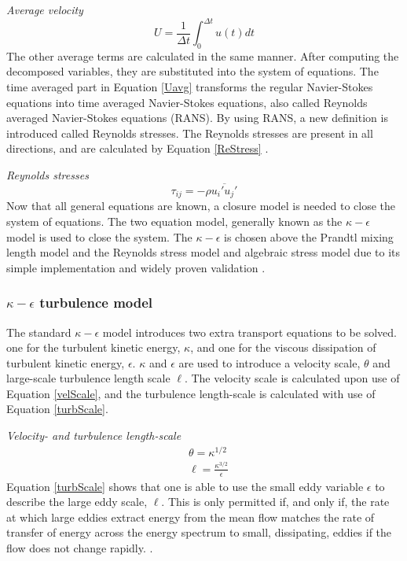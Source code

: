 \documentclass{CFD2017}
\begin{document}
\emph{Average velocity}
\begin{equation}
\label{Uavg}
U = \frac{1}{\Delta t}\int_{0}^{\Delta t}u(t)dt
\end{equation}
The other average terms are calculated in the same manner. After computing the decomposed variables, they are substituted into the system of equations. The time averaged part in Equation \ref{Uavg} transforms the regular Navier-Stokes equations into time averaged Navier-Stokes equations, also called Reynolds averaged Navier-Stokes equations (RANS). By using RANS, a new definition is introduced called Reynolds stresses. The Reynolds stresses are present in all directions, and are calculated by Equation \ref{ReStress} \cite{slides}. \vspace{2mm}

\emph{Reynolds stresses}
\begin{equation}
\label{ReStress}
\tau_{ij}=-\rho\overline{u_i'u_j'}
\end{equation}
Now that all general equations are known, a closure model is needed to close the system of equations. The two equation model, generally known as the $\kappa-\epsilon$ model is used to close the system. The $\kappa-\epsilon$ is chosen above the Prandtl mixing length model and the Reynolds stress model and algebraic stress model due to its simple implementation and widely proven validation \cite{Versteeg2007}.


\subsubsection{$\kappa-\epsilon$ turbulence model}
The standard  $\kappa-\epsilon$ model introduces two extra transport equations to be solved. one for the turbulent kinetic energy, $\kappa$, and one for the viscous dissipation of turbulent kinetic energy, $\epsilon$.  $\kappa$ and $\epsilon$ are used to introduce a velocity scale, $\theta$ and large-scale turbulence length scale $\ell$. The velocity scale is calculated upon use of Equation \ref{velScale}, and the turbulence length-scale is calculated with use of Equation \ref{turbScale}.\vspace{2mm}

\emph{Velocity- and turbulence length-scale}
\begin{align}
&\theta = \kappa^{1/2} \label{velScale}\\
&\ell=\frac{\kappa^{3/2}}{\epsilon} \label{turbScale}
\end{align}
Equation \ref{turbScale} shows that one is able to use the small eddy variable $\epsilon$ to describe the large eddy scale, $\ell$. This is only permitted if, and only if, the rate at which large eddies extract energy from the mean flow matches the rate of transfer of energy across the energy spectrum to small, dissipating, eddies if the flow does not change rapidly. \cite{Versteeg2007}.\\
\end{document}
